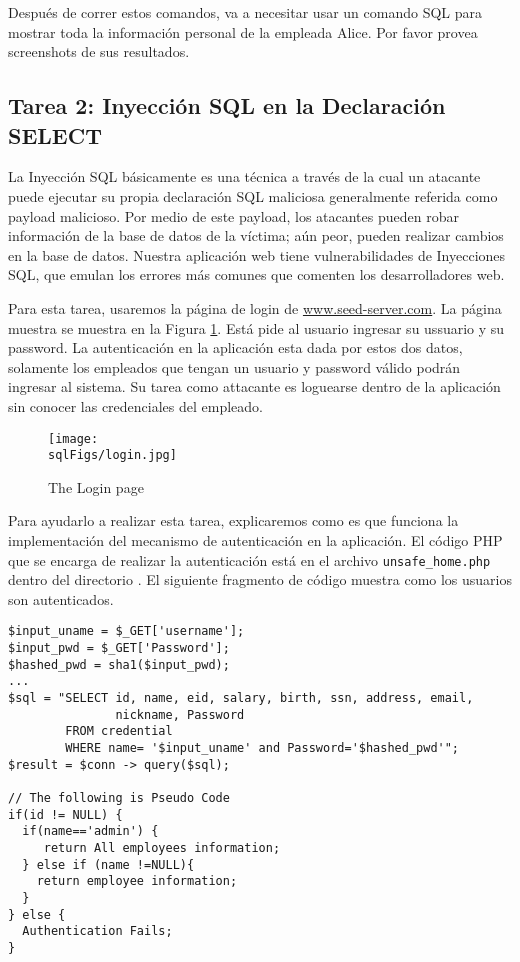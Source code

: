 Después de correr estos comandos, va a necesitar usar un comando SQL para mostrar toda la información personal de la empleada Alice. Por favor provea screenshots de sus resultados.

\subsection{Tarea 2: Inyección SQL en la Declaración SELECT} 

La Inyección SQL básicamente es una técnica a través de la cual un atacante puede ejecutar su propia declaración SQL maliciosa generalmente referida como payload malicioso. Por medio de este payload, los atacantes pueden robar información de la base de datos de la víctima; aún peor, pueden realizar cambios en la base de datos. Nuestra aplicación web tiene vulnerabilidades de Inyecciones SQL, que emulan los errores más comunes que comenten los desarrolladores web.

Para esta tarea, usaremos la página de login de \url{www.seed-server.com}.
La página muestra se muestra en la Figura \ref{sql:fig:login}.
Está pide al usuario ingresar su ussuario y su password.
La autenticación en la aplicación esta dada por estos dos datos, solamente los empleados que tengan un usuario y password válido podrán ingresar al sistema.
Su tarea como attacante es loguearse dentro de la aplicación sin conocer las credenciales del empleado. 


\begin{figure}[htb]
\begin{center}
\texttt{[image: \\sqlFigs/login.jpg]}
\end{center}
\caption{The Login page}
\label{sql:fig:login}
\end{figure}
 
Para ayudarlo a realizar esta tarea, explicaremos como es que funciona la implementación del mecanismo de autenticación en la aplicación. El código PHP que se encarga de realizar la autenticación está en el archivo \texttt{unsafe\_home.php} dentro del directorio .
El siguiente fragmento de código muestra como los usuarios son autenticados.

\begin{lstlisting}
$input_uname = $_GET['username'];
$input_pwd = $_GET['Password'];
$hashed_pwd = sha1($input_pwd);
...
$sql = "SELECT id, name, eid, salary, birth, ssn, address, email, 
               nickname, Password
        FROM credential
        WHERE name= '$input_uname' and Password='$hashed_pwd'";
$result = $conn -> query($sql);

// The following is Pseudo Code 
if(id != NULL) {
  if(name=='admin') {
     return All employees information;
  } else if (name !=NULL){
    return employee information;
  }
} else {
  Authentication Fails;
}
\end{lstlisting}

